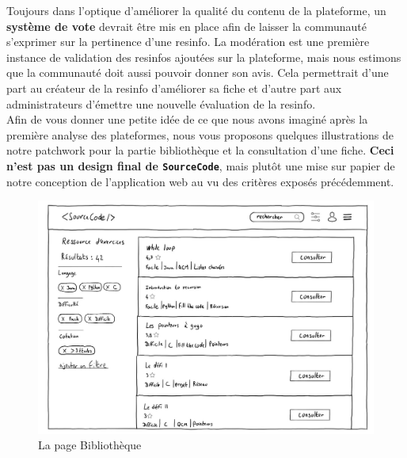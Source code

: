 Toujours dans l'optique d'améliorer la qualité du contenu de la plateforme, un \textbf{système de vote} devrait être mis en place afin de laisser la communauté s'exprimer sur la pertinence d'une \gls{resinfo}. La modération est une première instance de validation des \glspl{resinfo} ajoutées sur la plateforme, mais nous estimons que la communauté doit aussi pouvoir donner son avis. Cela permettrait d'une part au créateur de la \gls{resinfo} d'améliorer sa \gls{fiche} et d'autre part aux administrateurs d'émettre une nouvelle évaluation de la \gls{resinfo}.\\

Afin de vous donner une petite idée de ce que nous avons imaginé après la première analyse des plateformes, nous vous proposons quelques illustrations de notre patchwork pour la partie bibliothèque et la consultation d'une \gls{fiche}. \textbf{Ceci n'est pas un design final de \texttt{SourceCode}}, mais plutôt une mise sur papier de notre conception de l'application web au vu des critères exposés précédemment.\\

\begin{figure}[H]
    \includegraphics[width=\textwidth,height=\textheight,keepaspectratio]{images/library.JPG}
    \centering
    \caption{La page Bibliothèque}
\end{figure}
\label{figure:patchwork}

